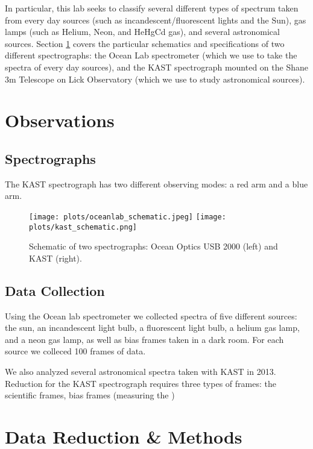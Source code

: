 \documentclass[preprint]{aastex62}
\begin{document}
In particular, this lab seeks to classify several different types of spectrum taken from every day sources (such as incandescent/fluorescent lights and the Sun), gas lamps (such as Helium, Neon, and HeHgCd gas), and several astronomical sources.
Section \ref{sec:observations} covers the particular schematics and specifications of two different spectrographs: the Ocean Lab spectrometer (which we use to take the spectra of every day sources), and the KAST spectrograph mounted on the Shane 3m Telescope on Lick Observatory (which we use to study astronomical sources). 


\section{Observations} \label{sec:observations}
\subsection{Spectrographs}
The KAST spectrograph has two different observing modes: a red arm and a blue arm.

\begin{figure}[H]
\begin{center}
\texttt{[image: plots/oceanlab\_schematic.jpeg]}
\texttt{[image: plots/kast\_schematic.png]} 
\caption{Schematic of two spectrographs: Ocean Optics USB 2000 (left) and KAST (right).}
\end{center}
\end{figure}

\subsection{Data Collection}
Using the Ocean lab spectrometer we collected spectra of five different sources: the sun, an incandescent light bulb, a fluorescent light bulb, a helium gas lamp, and a neon gas lamp, as well as bias frames taken in a dark room. For each source we colleced 100 frames of data.

We also analyzed several astronomical spectra taken with KAST in 2013. Reduction for the KAST spectrograph requires three types of frames: the scientific frames, bias frames (measuring the )

\section{Data Reduction \& Methods} \label{sec:methods}
\end{document}
